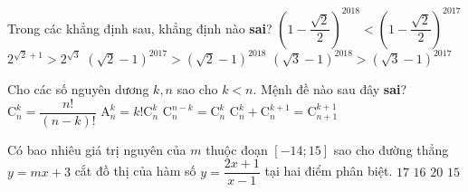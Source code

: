 \begin{ex}%
Trong các khẳng định sau, khẳng định nào \textbf{sai}?
\choice
{$\left(1 - \dfrac{\sqrt{2}}{2}\right)^{2018} < \left(1 - \dfrac{\sqrt{2}}{2}\right)^{2017}$}
{$2^{\sqrt{2}+ 1} > 2^{\sqrt{3}}$}
{$\left(\sqrt{2} - 1\right)^{2017} > \left(\sqrt{2} - 1\right)^{2018}$}
{\True $\left(\sqrt{3} - 1\right)^{2018} > \left(\sqrt{3} - 1\right)^{2017}$}
\end{ex}




\begin{ex}%
Cho các số nguyên dương $k, n$ sao cho $k<n$. Mệnh đề nào sau đây \textbf{sai}?
\choice
{\True $\mathrm{C}_n^k = \dfrac{n!}{(n-k)!}$}
{$\mathrm{A}_n^k = k!\mathrm{C}_n^k$}
{$\mathrm{C}_n^{n - k} = \mathrm{C}_n^k$}
{$\mathrm{C}_n^k + \mathrm{C}_n^{k+1} = \mathrm{C}_{n + 1}^{k+1}$}
\end{ex}





\begin{ex}%
Có bao nhiêu giá trị nguyên của $m$ thuộc đoạn $\left[-14; 15\right]$ sao cho đường thẳng $y = mx + 3$ cắt đồ thị của hàm số $y = \dfrac{2x + 1}{x - 1}$ tại hai điểm phân biệt.
\choice
{$17$}
{\True $16$}
{$20$}
{$15$}
\end{ex}




